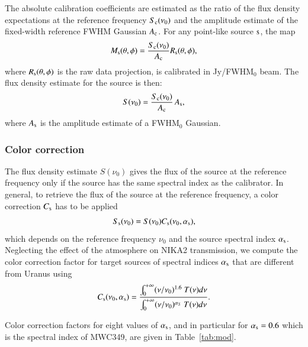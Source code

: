 The absolute calibration coefficients are estimated as the ratio of
the flux density expectations at the reference frequency
$S_{\rm{c}}(\nu_0)$ and the amplitude estimate of the fixed-width reference
FWHM Gaussian $A_{\rm{c}}$. For any point-like source $\rm{s}$, the map
\begin{equation}
  M_{\rm{s}}(\theta, \phi) = \frac{S_{\rm{c}} (\nu_{0})}{A_{\rm{c}}}
  R_{\rm{s}}(\theta,\phi),
\end{equation}
where $R_{\rm{s}}(\theta,\phi)$ is the raw data projection, is calibrated in Jy/FWHM$_{0}$
beam. The flux density estimate for the source is then:
\begin{equation}
S(\nu_{0})  = \frac{S_{\rm{c}}(\nu_{0})}{A_{\rm{c}}} \, A_{\rm{s}},
\label{eq:pointsourcephot}
\end{equation}
where $A_{\rm{s}}$ is the amplitude estimate of a FWHM$_0$ Gaussian.

\subsubsection{Color correction}

The flux density estimate $S(\nu_{0})$ gives the
flux of the source at the reference frequency only if the source has
the same spectral index as the calibrator. In general, to retrieve the
flux of the source at the reference frequency, a color correction
$C_{\rm{s}}$ has to be applied
\begin{equation}
S_{\rm{s}}(\nu_{0}) = S(\nu_{0})  C_{\rm{s}}(\nu_{0}, \alpha_{\rm{s}}),
\end{equation}
which depends on the reference frequency $\nu_{0}$ and the source
spectral index $\alpha_{\rm{s}}$.
Neglecting the effect of the atmosphere on NIKA2 transmission, we compute the color correction
factor for target sources of spectral indices $\alpha_{\rm{s}}$ that are
different from Uranus using
\begin{equation}
  C_{\rm{s}}(\nu_{0}, \alpha_{\rm{s}}) = \frac{\int_{0}^{+\infty} (\nu/\nu_0)^{1.6} ~T({\nu}) d\nu}{ \int_{0}^{+\infty} (\nu
    /\nu_0)^{\alpha_S} ~ T({\nu}) d\nu}.
    \label{eq:color_correction}
\end{equation}

Color correction factors for eight values of $\alpha_{\rm{s}}$, and in particular
for $\alpha_{\rm{s}}= 0.6$ which is the spectral index of MWC349, are
given in Table~\ref{tab:mod}. 

